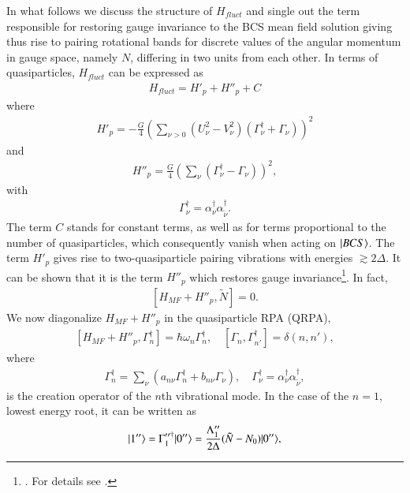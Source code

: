 In what follows we  discuss the structure of $H_{fluct}$ and single out the term responsible for restoring gauge invariance to the BCS mean field solution giving thus rise to pairing rotational bands for discrete values of the angular momentum in gauge space, namely $N$, differing in two units from each other. In terms of quasiparticles, $H_{fluct}$ can be expressed  as
\begin{align}\label{eq0.1.91}
H_{fluct}=H'_p+H''_p+C
\end{align}
where 
\begin{align}\label{eq0.1.92}
H'_p=-\frac{G}{4}\left(\sum_{\nu>0}\left(U^2_\nu-V^2_\nu\right)\left(\Gamma^\dagger_\nu+\Gamma_\nu\right)\right)^2
\end{align}
and
\begin{align}\label{eq0.1.93}
H''_p=\frac{G}{4}\left(\sum_{\nu}\left(\Gamma^\dagger_\nu-\Gamma_\nu\right)\right)^2,
\end{align}
with
\begin{align}\label{eq0.1.94}
\Gamma^\dagger_\nu=\alpha^\dagger_\nu\alpha_{\tilde \nu}^\dagger.
\end{align}
The term $C$ stands for constant terms, as well as for terms proportional to the number of quasiparticles, which consequently vanish when acting on $|{BCS} \rangle$. The term $H'_p$ gives rise to two-quasiparticle pairing vibrations with energies $\gtrsim2\Delta$. It can be shown that it is the term $H''_p$ which restores gauge invariance\footnote{\cite{Hogassen:61,Bes:66}. For details see \cite{Brink:05}.}. In fact,
\begin{align}\label{eq0.1.95}
\left[H_{MF}+H''_p,\tilde N\right]=0.
\end{align}
We now diagonalize $H_{MF}+H''_p$ in the quasiparticle RPA (QRPA),
\begin{align}\label{eq0.1.96}
\left[H_{MF}+H''_p,\Gamma^\dagger_n\right]=\hbar\omega_n\Gamma^\dagger_n,\quad \left[\Gamma_n,\Gamma^\dagger_{n'}\right]=\delta(n,n'),
\end{align}
where
\begin{align}\label{eq0.1.97}
\Gamma^\dagger_n=\sum_{\nu}\left(a_{n\nu}\Gamma^\dagger_n+b_{n\nu}\Gamma_\nu\right),\quad \Gamma^\dagger_\nu=\alpha^\dagger_\nu\alpha^\dagger_{\tilde\nu},	
\end{align}
is the creation operator of the $n$th vibrational mode. In the case of the $n=1$, lowest energy root, it can be written as
\begin{align}\label{eq0.1.98}
|{1''} \rangle=\Gamma''^\dagger_1|{0''} \rangle=\frac{\Lambda''_1}{2\Delta}(\tilde N-N_0)|{0''} \rangle,	
\end{align}
